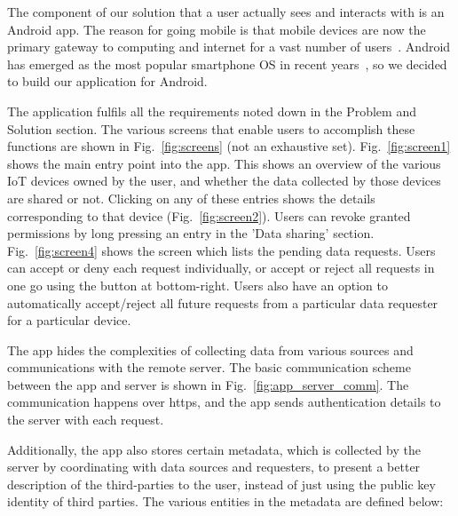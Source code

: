The component of our solution that a user actually sees and interacts with is an Android app. The reason for going mobile is that mobile devices are now the primary gateway to computing and internet for a vast number of users~\cite{statcount}. Android has emerged as the most popular smartphone OS in recent years~\cite{idc_android}, so we decided to build our application for Android.

The application fulfils all the requirements noted down in the Problem and Solution section. The various screens that enable users to accomplish these functions are shown in Fig.~\ref{fig:screens} (not an exhaustive set). Fig.~\ref{fig:screen1} shows the main entry point into the app. This shows an overview of the various IoT devices owned by the user, and whether the data collected by those devices are shared or not. Clicking on any of these entries shows the details corresponding to that device (Fig.~\ref{fig:screen2}). Users can revoke granted permissions by long pressing an entry in the 'Data sharing' section. Fig.~\ref{fig:screen4} shows the screen which lists the pending data requests. Users can accept or deny each request individually, or accept or reject all requests in one go using the button at bottom-right. Users also have an option to automatically accept/reject all future requests from a particular data requester for a particular device.

The app hides the complexities of collecting data from various sources and communications with the remote server. The basic communication scheme between the app and server is shown in Fig.~\ref{fig:app_server_comm}. The communication happens over https, and the app sends authentication details to the server with each request.

Additionally, the app also stores certain metadata, which is collected by the server by coordinating with data sources and requesters, to present a better description of the third-parties to the user, instead of just using the public key identity of third parties. The various entities in the metadata are defined below:

